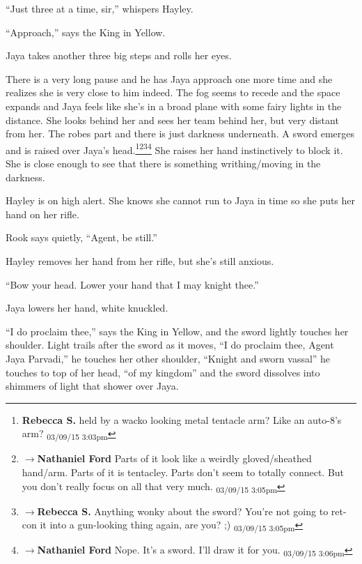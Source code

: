 ``Just three at a time, sir,'' whispers Hayley.

``Approach,'' says the King in Yellow.

Jaya takes another three big steps and rolls her eyes.



There is a very long pause and he has Jaya approach one more time and she realizes she is very close to him indeed.  The fog seems to recede and the space expands and Jaya feels like she's in a broad plane with some fairy lights in the distance.  She looks behind her and sees her team behind her, but very distant from her.  The robes part and there is just darkness underneath.  A sword emerges and is raised over Jaya's head.\footnote{\textbf{Rebecca S. }held by a wacko looking metal tentacle arm? Like an auto-8's arm? \textsubscript{03/09/15 3:03pm}}\footnote{$\rightarrow$\textbf{Nathaniel Ford }Parts of it look like a weirdly gloved/sheathed hand/arm. Parts of it is tentacley. Parts don't seem to totally connect. But you don't really focus on all that very much. \textsubscript{03/09/15 3:05pm}}\footnote{$\rightarrow$\textbf{Rebecca S. }Anything wonky about the sword? You're not going to ret-con it into a gun-looking thing again, are you? ;) \textsubscript{03/09/15 3:05pm}}\footnote{$\rightarrow$\textbf{Nathaniel Ford }Nope. It's a sword. I'll draw it for you. \textsubscript{03/09/15 3:06pm}}  She raises her hand instinctively to block it.  She is close enough to see that there is something writhing/moving in the darkness.



Hayley is on high alert.  She knows she cannot run to Jaya in time so she puts her hand on her rifle.

Rook says quietly, ``Agent, be still.''

Hayley removes her hand from her rifle, but she's still anxious.



``Bow your head.  Lower your hand that I may knight thee.''

Jaya lowers her hand, white knuckled.

``I do proclaim thee,'' says the King in Yellow, and the sword lightly touches her shoulder.   Light trails after the sword as it moves, ``I do proclaim thee, Agent Jaya Parvadi,'' he touches her other shoulder, ``Knight and sworn vassal'' he touches to top of her head, ``of my kingdom'' and the sword dissolves into shimmers of light that shower over Jaya.



